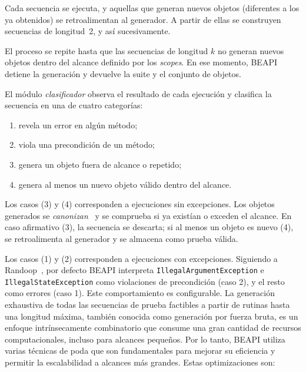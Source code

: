 Cada secuencia se ejecuta, y aquellas que generan nuevos objetos (diferentes 
a los ya obtenidos) se retroalimentan al generador. A partir de ellas se 
construyen secuencias de longitud~2, y así sucesivamente.  

El proceso se repite hasta que las secuencias de longitud $k$ no generan nuevos 
objetos dentro del alcance definido por los \emph{scopes}. En ese momento, 
\textsf{BEAPI} detiene la generación y devuelve la suite y el conjunto de 
objetos.

El módulo \emph{clasificador} observa el resultado de cada ejecución y clasifica 
la secuencia en una de cuatro categorías:
\begin{enumerate}
    \item revela un error en algún método;
    \item viola una precondición de un método;
    \item genera un objeto fuera de alcance o repetido;
    \item genera al menos un nuevo objeto válido dentro del alcance.
\end{enumerate}

Los casos (3) y (4) corresponden a ejecuciones sin excepciones.  
Los objetos generados se \emph{canonizan}~\cite{Politano20} y se comprueba 
si ya existían o exceden el alcance. En caso afirmativo (3), la secuencia se 
descarta; si al menos un objeto es nuevo (4), se retroalimenta al generador 
y se almacena como prueba válida.

Los casos (1) y (2) corresponden a ejecuciones con excepciones.  
Siguiendo a Randoop~\cite{Pacheco07}, por defecto \textsf{BEAPI} interpreta 
\texttt{IllegalArgumentException} e \texttt{IllegalStateException} como 
violaciones de precondición (caso 2), y el resto como errores (caso 1).  
Este comportamiento es configurable.
La generación exhaustiva de todas las secuencias de prueba factibles a partir de rutinas hasta una longitud máxima, 
también conocida como generación por fuerza bruta, es un enfoque intrínsecamente combinatorio que consume una gran cantidad de recursos computacionales, 
incluso para alcances pequeños. 
Por lo tanto, \textsf{BEAPI} utiliza varias técnicas de poda que son fundamentales para mejorar su eficiencia y permitir la escalabilidad a alcances más grandes.
Estas optimizaciones son:

